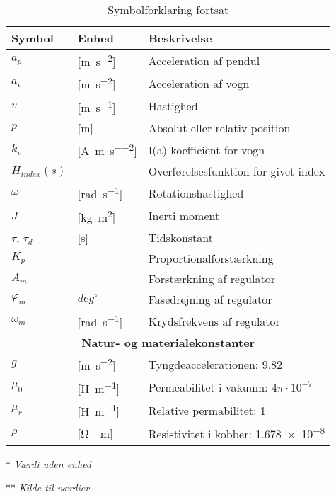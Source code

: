 \begin{table}[h!]
\centering
\caption{Symbolforklaring fortsat}
\label{tab:symboler2}
\begin{threeparttable}
\begin{tabular}{l l l}
\toprule
\multicolumn{1}{l}{Symbol}       &
\multicolumn{1}{l}{Enhed}        &
\multicolumn{1}{l}{Beskrivelse}  \\ 
\midrule
$a_p$					&	[\si{\meter\per\second\squared}]	 &  Acceleration af pendul		\\
$a_v$					&	[\si{\meter\per\second\squared}]	 &  Acceleration af vogn		\\
$v$					&	[\si{\meter\per\second}]	 &  Hastighed		\\
$p$					&	[\si{\meter}]	 &  Absolut eller relativ position		\\
$k_v$					&	[\si{\ampere\per\meter\per\second\squared}]	 &  I(a) koefficient for vogn 		\\
$H_{index}(s)$					&		 & Overførelsesfunktion for givet index 		\\
$\omega$					&	[\si{\radian\per\second}]	 &  Rotationshastighed		\\
$J$					&	[\si{\kilogram\meter\squared}]	 & Inerti moment  		\\
$\tau$, $\tau_d$					&	[\si{\second}]	 &  Tidskonstant		\\
$K_p$					&		 & Proportionalforstærkning  		\\
$A_m$					&	 &  Forstærkning af regulator		\\
$\varphi_m$					& $deg^{\circ}$	 &  Fasedrejning af regulator		\\
$\omega_m$					&	[\si{\radian\per\second}]	 & Krydsfrekvens af regulator   		\\
\midrule
\multicolumn{3}{c}{\textbf{Natur- og materialekonstanter\tnote{**}}}       \\
\midrule
$g$         &	[\si{\meter\per\second^2}]		&	Tyngdeaccelerationen: \num{9,82} \\
$\mu_0$		&	[\si{\henry\per\meter}]			&	Permeabilitet i vakuum: $4\pi\cdot10^{-7}$ \\
$\mu_r$		&	[\si{\henry\per\meter}]			&	Relative permabilitet: 1\\
$\rho$		&	[\si{\ohm\cdot\meter}]			&
Resistivitet i kobber: \num{1,678e-8} \\
\bottomrule
\end{tabular}
\begin{tablenotes}
\item[*] \textit{Værdi uden enhed}
\item[**] \textit{Kilde til værdier \cite{Halliday2014}}
\end{tablenotes}
\end{threeparttable}
\end{table}

